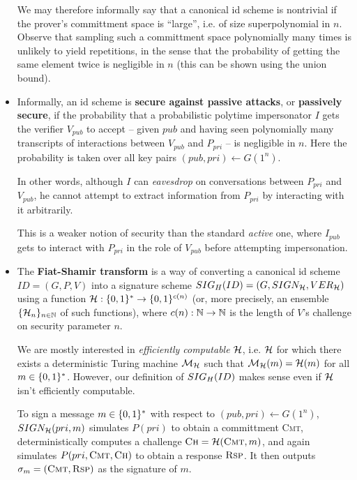 \documentclass[12pt,twoside]{article}
\begin{document}
\begin{itemize}
We may therefore informally say that a canonical id scheme is nontrivial if 
the prover's committment space is ``large'', i.e. of size superpolynomial in 
$n$. Observe that sampling such a committment space polynomially many times is 
unlikely to yield repetitions, in the sense that the probability of getting
the same element twice is negligible in $n$ (this can be shown using the union
bound).

\item Informally, an id scheme is {\bf secure against passive attacks}, or
{\bf passively secure}, if the probability that a probabilistic polytime 
impersonator $I$ gets the verifier $V_{pub}$ to accept -- given $pub$ and 
having seen polynomially many transcripts of interactions between $V_{pub}$ 
and $P_{pri}$ -- is negligible in $n$. Here the probability is taken over all
key pairs $(pub,pri) \gets G(1^n)$.

In other words, although $I$ can {\it eavesdrop} on 
conversations between $P_{pri}$ and $V_{pub}$, he cannot attempt to extract 
information from $P_{pri}$ by interacting with it arbitrarily. 

This is a weaker notion of security than the standard {\it active} one, where 
$I_{pub}$ gets to interact with $P_{pri}$ in the role of $V_{pub}$ before 
attempting impersonation.

\item The {\bf Fiat-Shamir transform} is a way of converting a canonical id
scheme $ID = (G,P,V)$ into a signature scheme $\fs{ID}{H} = (G,
SIGN_\fanh,VER_\fanh)$ using a function $\fanh: \strs{*} \to \strs{c(n)}$ 
(or, more precisely, an ensemble $\ens{\fanh}{n}$ of such functions), 
where $c(n): \nats \to \nats$ is the length of $V$'s challenge on
security parameter $n$. 

We are mostly interested in {\it efficiently computable} $\fanh$, i.e. $\fanh$
for which there exists a deterministic Turing machine $\fanm_\fanh$ such that
$\fanm_\fanh(m) = \fanh(m)$ for all $m \in \strs{*}$. However, our definition
of $\fs{ID}{H}$ makes sense even if $\fanh$ isn't efficiently computable.

To sign a message $m \in \strs{*}$ with respect to $(pub,pri) \gets G(1^n)$, 
$SIGN_\fanh(pri,m)$ simulates $P(pri)$ to obtain a committment 
\textsc{Cmt}, deterministically computes a challenge $\textsc{Ch} = 
\fanh(\textsc{Cmt},m)$, and again simulates $P(pri,\textsc{Cmt},\textsc{Ch})$
to obtain a response $\textsc{Rsp}$. It then outputs $\sigma_m =
(\textsc{Cmt},\textsc{Rsp})$ as the signature of $m$.


\end{itemize}
\end{document}

